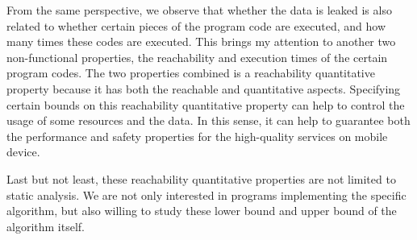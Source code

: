 {From the same perspective, we observe that whether the data is leaked is also related to whether certain pieces of the program code are executed,
and how many times these codes are executed.
This brings my attention to another two non-functional properties, the reachability and execution times of the certain program codes.
The two properties combined is a reachability quantitative property because it has both the reachable and quantitative aspects.
Specifying certain bounds
on this reachability quantitative property
can help to control the usage of some resources and the data.
In this sense, it can help to guarantee both the performance and safety properties for the high-quality services on mobile device.
}


Last but not least, these reachability quantitative properties are not limited to static analysis.
We are not only interested in programs implementing the specific algorithm, but also willing to study these lower bound and upper bound of the algorithm itself.

